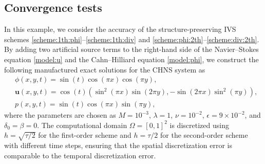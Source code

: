 \subsection{Convergence tests}\label{subsec:e1}
In this example, we consider the accuracy  of the structure-preserving IVS schemes \eqref{scheme:1th:phi}--\eqref{scheme:1th:div} and \eqref{scheme:phi:2th}--\eqref{scheme:div:2th}. By adding two artificial source terms  to the right-hand side of the Navier--Stokes equation  \eqref{model:u} and  the Cahn--Hilliard equation \eqref{model:phi}, we construct the following manufactured exact solutions for the CHNS system as
\begin{equation*}
	\begin{aligned}
		& \phi(x, y, t)=\sin (t) \cos (\pi x) \cos (\pi y), \\
		& \bm u(x, y, t)=\cos (t)(\sin ^2(\pi x) \sin (2\pi y),-\sin (2\pi x) \sin ^2(\pi y)), \\
		& p(x, y, t)=\sin (t) \cos (\pi x) \sin (\pi y),
	\end{aligned}
\end{equation*}
where the parameters are chosen as
$M=  10^{-3}$, $\lambda = 1$, $\nu=10^{-2}$, $\epsilon= 9 \times 10^{-2}$,  and $\delta_0 = \beta =0$.
The computational domain $\Omega=[0,1]^2$ is discretized using $h=\sqrt{\tau/2}$ for the first-order scheme and $h=\tau/2$ for the second-order scheme with different time steps, ensuring that the spatial discretization error is comparable to the temporal discretization error.
